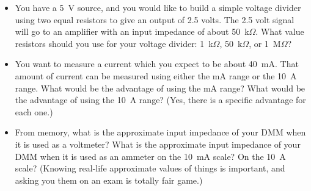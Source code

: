 \begin{itemize}
\item You have a 5~V source, and you would like to build a simple voltage divider using two equal resistors to give an output of 2.5 volts.  The 2.5 volt signal will go to an amplifier with an input impedance of about 50~k$\Omega$.  What value resistors should you use for your voltage divider: 1~k$\Omega$, 50~k$\Omega$, or 1~M$\Omega$?

\item You want to measure a current which you expect to be about 40~mA.  That amount of current can be measured using either the mA range or the 10~A range.  What would be the advantage of using the mA range?  What would be the advantage of using the 10~A range? (Yes, there is a specific advantage for each one.)  

\item From memory, what is the approximate input impedance of your DMM when it is used as a voltmeter?  What is the approximate input impedance of your DMM when it is used as an ammeter on the 10~mA scale?  On the 10~A scale?  (Knowing real-life approximate values of things is important, and asking you them on an exam is totally fair game.)
\end{itemize}




